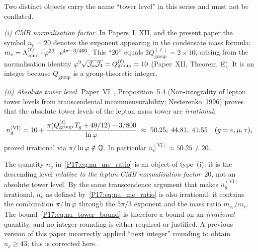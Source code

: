 \begin{remark}
\label{P17:rem:nconv}
Two distinct objects carry the name ``tower level'' in this series and
must not be conflated.

\emph{(i) CMB normalisation factor.}  In Papers~I, XII, and the present
paper the symbol $n_e=20$ denotes the exponent appearing in the condensate
mass formula: $m_e=\Lambda_{\mathrm{cond}}^{(\ell)}\cdot\varphi^{20}\cdot e^{4\pi-3/400}$.  This
``20'' equals $2Q_{\mathrm{group}}^{(\ell)}=2\times10$, arising from the
normalisation identity $\varphi^9\sqrt{\mathcal{J}_a\mathcal{J}_4}=Q_{\mathrm{group}}^{(\ell)}=10$
(Paper~XII, Theorem~E).  It is an integer because $Q_{\mathrm{group}}$
is a group-theoretic integer.

\emph{(ii) Absolute tower level.}  Paper~VI~\cite{Paper6},
Proposition~5.4 (Non-integrality of lepton tower levels from
transcendental incommensurability; Nesterenko~1996) proves that the
absolute tower levels of the
lepton mass tower are \emph{irrational}:
\[
  n_g^{\mathrm{(VI)}} = 10 + \frac{\pi(Q_{\mathrm{group}}^{(\ell)}\,T_g + 49/12)
  - 3/800}{\ln\varphi}
  \;\approx\; 50.25,\;44.81,\;41.55
  \quad (g=e,\mu,\tau),
\]
proved irrational via $\pi/\ln\varphi\notin\mathbb{Q}$.  In particular
$n_e^{\mathrm{(VI)}}\approx50.25\neq20$.

The quantity $n_\nu$ in~\eqref{P17:eq:nu_me_ratio} is an object of type~(i):
it is the descending level \emph{relative to the lepton CMB normalisation
factor~$20$}, not an absolute tower level.  By the same transcendence
argument that makes $n_g^{\mathrm{(VI)}}$ irrational, $n_\nu$ as defined
by~\eqref{P17:eq:nu_me_ratio} is also irrational: it contains the combination
$\pi/\ln\varphi$ through the $5\pi/3$ exponent and the mass ratio
$m_{\nu_1}/m_e$.  The bound~\eqref{P17:eq:nu_tower_bound} is therefore a
bound on an \emph{irrational} quantity, and no integer rounding is either
required or justified.  A previous version of this paper incorrectly
applied ``next integer'' rounding to obtain $n_\nu\geq43$; this is
corrected here.
\end{remark}

